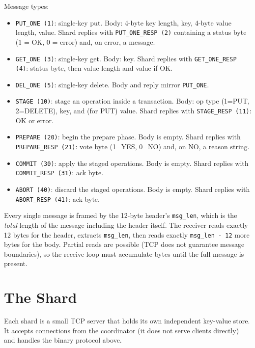 \documentclass[11pt,a4paper]{article}
\begin{document}
Message types:

\begin{itemize}
\item \texttt{PUT\_ONE (1)}: single-key put. Body: 4-byte key length, key, 4-byte value length, value. Shard replies with \texttt{PUT\_ONE\_RESP (2)} containing a status byte (1 = OK, 0 = error) and, on error, a message.
\item \texttt{GET\_ONE (3)}: single-key get. Body: key. Shard replies with \texttt{GET\_ONE\_RESP (4)}: status byte, then value length and value if OK.
\item \texttt{DEL\_ONE (5)}: single-key delete. Body and reply mirror \texttt{PUT\_ONE}.
\item \texttt{STAGE (10)}: stage an operation inside a transaction. Body: op type (1=PUT, 2=DELETE), key, and (for PUT) value. Shard replies with \texttt{STAGE\_RESP (11)}: OK or error.
\item \texttt{PREPARE (20)}: begin the prepare phase. Body is empty. Shard replies with \texttt{PREPARE\_RESP (21)}: vote byte (1=YES, 0=NO) and, on NO, a reason string.
\item \texttt{COMMIT (30)}: apply the staged operations. Body is empty. Shard replies with \texttt{COMMIT\_RESP (31)}: ack byte.
\item \texttt{ABORT (40)}: discard the staged operations. Body is empty. Shard replies with \texttt{ABORT\_RESP (41)}: ack byte.
\end{itemize}

Every single message is framed by the 12-byte header's \texttt{msg\_len}, which is the \textit{total} length of the message including the header itself. The receiver reads exactly 12 bytes for the header, extracts \texttt{msg\_len}, then reads exactly \texttt{msg\_len - 12} more bytes for the body. Partial reads are possible (TCP does not guarantee message boundaries), so the receive loop must accumulate bytes until the full message is present.

\section{The Shard}

Each shard is a small TCP server that holds its own independent key-value store. It accepts connections from the coordinator (it does not serve clients directly) and handles the binary protocol above.
\end{document}
